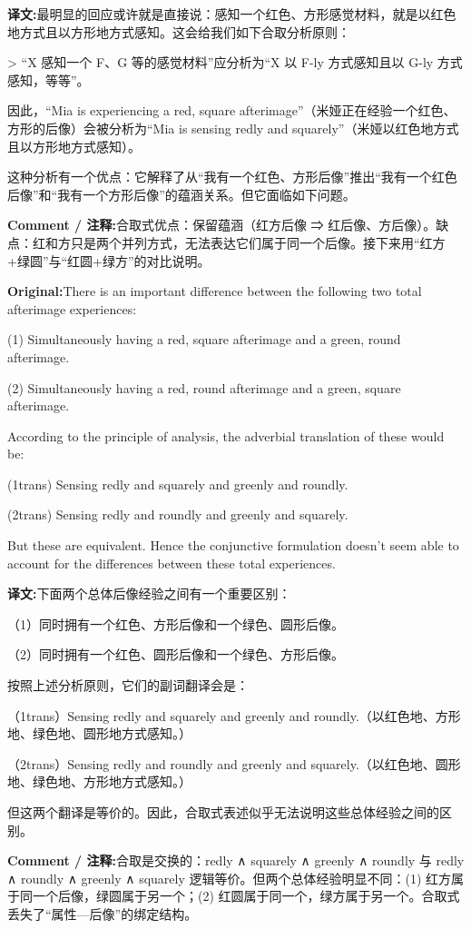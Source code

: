 \documentclass[11pt,a4paper]{article}
\newcommand{\eng}[1]{\begin{engbox}\noindent\textbf{Original:}\quad #1\end{engbox}}
\newcommand{\cn}[1]{\begin{cnbox}\noindent\textbf{译文:}\quad #1\end{cnbox}}
\newcommand{\cmt}[1]{\begin{commentbox}\noindent\textbf{Comment / 注释:}\quad #1\end{commentbox}}
\begin{document}
\cn{最明显的回应或许就是直接说：感知一个红色、方形感觉材料，就是以红色地方式且以方形地方式感知。这会给我们如下合取分析原则：

> “X 感知一个 F、G 等的感觉材料”应分析为“X 以 F-ly 方式感知且以 G-ly 方式感知，等等”。

因此，“Mia is experiencing a red, square afterimage”（米娅正在经验一个红色、方形的后像）会被分析为“Mia is sensing redly and squarely”（米娅以红色地方式且以方形地方式感知）。

这种分析有一个优点：它解释了从“我有一个红色、方形后像”推出“我有一个红色后像”和“我有一个方形后像”的蕴涵关系。但它面临如下问题。}

\cmt{合取式优点：保留蕴涵（红方后像 ⇒ 红后像、方后像）。缺点：红和方只是两个并列方式，无法表达它们属于同一个后像。接下来用“红方+绿圆”与“红圆+绿方”的对比说明。}

\eng{There is an important difference between the following two total afterimage experiences:

(1) Simultaneously having a red, square afterimage and a green, round afterimage.

(2) Simultaneously having a red, round afterimage and a green, square afterimage.

According to the principle of analysis, the adverbial translation of these would be:

(1trans) Sensing redly and squarely and greenly and roundly.

(2trans) Sensing redly and roundly and greenly and squarely.

But these are equivalent. Hence the conjunctive formulation doesn’t seem able to account for the differences between these total experiences.}

\cn{下面两个总体后像经验之间有一个重要区别：

（1）同时拥有一个红色、方形后像和一个绿色、圆形后像。

（2）同时拥有一个红色、圆形后像和一个绿色、方形后像。

按照上述分析原则，它们的副词翻译会是：

（1trans）Sensing redly and squarely and greenly and roundly.（以红色地、方形地、绿色地、圆形地方式感知。）

（2trans）Sensing redly and roundly and greenly and squarely.（以红色地、圆形地、绿色地、方形地方式感知。）

但这两个翻译是等价的。因此，合取式表述似乎无法说明这些总体经验之间的区别。}

\cmt{合取是交换的：redly ∧ squarely ∧ greenly ∧ roundly 与 redly ∧ roundly ∧ greenly ∧ squarely 逻辑等价。但两个总体经验明显不同：(1) 红方属于同一个后像，绿圆属于另一个；(2) 红圆属于同一个，绿方属于另一个。合取式丢失了“属性—后像”的绑定结构。}
\end{document}
